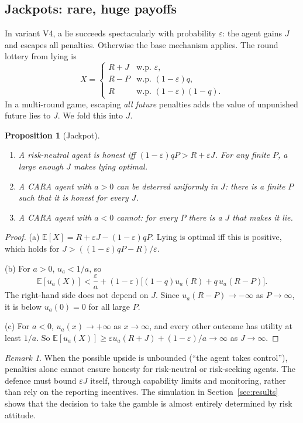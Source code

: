 \documentclass[11pt]{article}
\newtheorem{proposition}[theorem]{Proposition}
\theoremstyle{definition}
\theoremstyle{remark}
\newtheorem{remark}[theorem]{Remark}
\newcommand{\E}{\mathbb{E}}
\newcommand{\1}{\mathbf{1}}
\begin{document}
\subsection{Jackpots: rare, huge payoffs}

In variant V4, a lie succeeds spectacularly with probability $\varepsilon$: the agent
gains $J$ and escapes all penalties. Otherwise the base mechanism applies. The round
lottery from lying is
\[
X=\begin{cases}R+J & \text{w.p. } \varepsilon,\\ R-P & \text{w.p. } (1-\varepsilon)q,\\
R & \text{w.p. } (1-\varepsilon)(1-q).\end{cases}
\]
In a multi-round game, escaping \emph{all future} penalties adds the value of unpunished
future lies to $J$. We fold this into $J$.

\begin{proposition}[Jackpot]\label{prop:jackpot}
\begin{enumerate}[label=(\alph*)]
    \item A risk-neutral agent is honest iff $(1-\varepsilon)qP>R+\varepsilon J$. For any
    finite $P$, a large enough $J$ makes lying optimal.
    \item A CARA agent with $a>0$ can be deterred \emph{uniformly in $J$}: there is a
    finite $P$ such that it is honest for every $J$.
    \item A CARA agent with $a<0$ cannot: for every $P$ there is a $J$ that makes it lie.
\end{enumerate}
\end{proposition}

\begin{proof}
(a) $\E[X]=R+\varepsilon J-(1-\varepsilon)qP$. Lying is optimal iff this is positive,
which holds for $J>((1-\varepsilon)qP-R)/\varepsilon$.

(b) For $a>0$, $u_a<1/a$, so
\[
\E[u_a(X)]<\frac{\varepsilon}{a}+(1-\varepsilon)\big[(1-q)u_a(R)+q\,u_a(R-P)\big].
\]
The right-hand side does not depend on $J$. Since $u_a(R-P)\to-\infty$ as $P\to\infty$,
it is below $u_a(0)=0$ for all large $P$.

(c) For $a<0$, $u_a(x)\to+\infty$ as $x\to\infty$, and every other outcome has
utility at least $1/a$. So $\E[u_a(X)]\ge\varepsilon u_a(R+J)+(1-\varepsilon)/a\to\infty$
as $J\to\infty$.
\end{proof}

\begin{remark}
When the possible upside is unbounded (``the agent takes control''), penalties alone
cannot ensure honesty for risk-neutral or risk-seeking agents. The defence must bound
$\varepsilon J$ itself, through capability limits and monitoring, rather than rely on the
reporting incentives. The simulation in Section~\ref{sec:results} shows that the decision
to take the gamble is almost entirely determined by risk attitude.
\end{remark}
\end{document}
